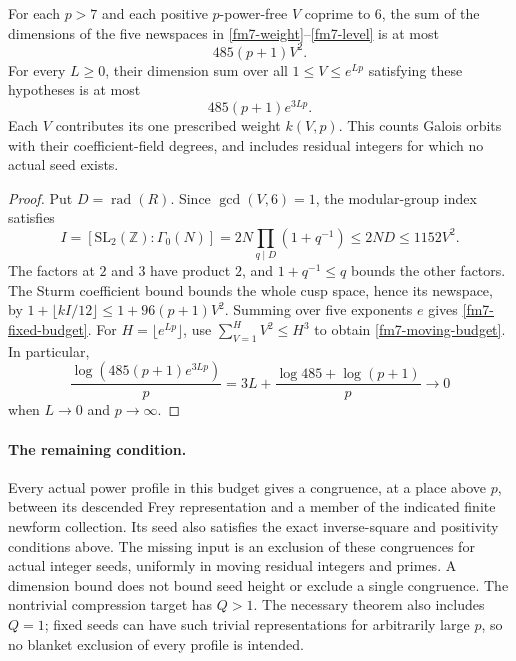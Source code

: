 \begin{corollary}\label{fm7-budget}
For each $p>7$ and each positive $p$-power-free $V$ coprime to $6$, the
sum of the dimensions of the five newspaces in
\eqref{fm7-weight}--\eqref{fm7-level} is at most
\begin{equation}\label{fm7-fixed-budget}
 485(p+1)V^2.
\end{equation}
For every $L\ge0$, their dimension sum over all $1\le V\le e^{Lp}$
satisfying these hypotheses is at most
\begin{equation}\label{fm7-moving-budget}
 485(p+1)e^{3Lp}.
\end{equation}
Each $V$ contributes its one prescribed weight $k(V,p)$. This counts
Galois orbits with their coefficient-field degrees, and includes
residual integers for which no actual seed exists.
\end{corollary}

\begin{proof}
Put $D=\operatorname{rad}(R)$. Since $\gcd(V,6)=1$, the modular-group
index satisfies
\[
 I=[\mathrm{SL}_2(\mathbb Z):\Gamma_0(N)]
   =2N\prod_{q\mid D}(1+q^{-1})\le2ND\le1152V^2.
\]
The factors at $2$ and $3$ have product $2$, and
$1+q^{-1}\le q$ bounds the other factors. The Sturm coefficient bound
\cite{PARIModularForms} bounds the whole cusp space, hence its newspace,
by $1+\lfloor kI/12\rfloor\le1+96(p+1)V^2$. Summing over five
exponents $e$ gives \eqref{fm7-fixed-budget}. For
$H=\lfloor e^{Lp}\rfloor$, use $\sum_{V=1}^H V^2\le H^3$ to obtain
\eqref{fm7-moving-budget}. In particular,
\[
 \frac{\log(485(p+1)e^{3Lp})}{p}
   =3L+\frac{\log485+\log(p+1)}p\longrightarrow0
\]
when $L\to0$ and $p\to\infty$.
\end{proof}

\paragraph{The remaining condition.}
Every actual power profile in this budget gives a congruence, at a place
above $p$, between its descended Frey representation and a member of
the indicated finite newform collection. Its seed also satisfies the
exact inverse-square and positivity conditions above. The missing input
is an exclusion of these congruences for actual integer seeds, uniformly
in moving residual integers and primes. A dimension bound does not
bound seed height or exclude a single congruence.
The nontrivial compression target has $Q>1$. The necessary theorem
also includes $Q=1$; fixed seeds can have such trivial representations
for arbitrarily large $p$, so no blanket exclusion of every profile
is intended.


